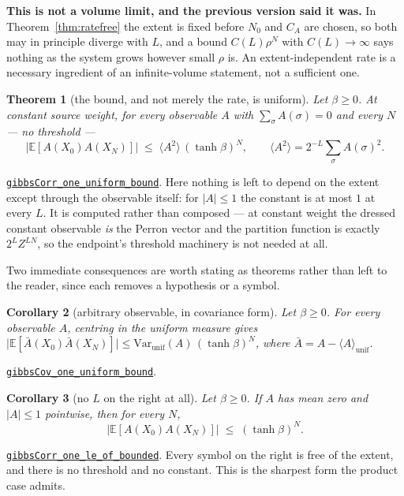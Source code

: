 \documentclass[11pt]{article}
\newtheorem{theorem}{Theorem}[section]
\newtheorem{corollary}[theorem]{Corollary}
\theoremstyle{definition}
\newcommand{\anchor}{247de2b31c8b2b6edb2cffe5fd6d96d6aa5c8a7a}
\newcommand{\osline}[3]{%
  \href{https://github.com/lluiseriksson/THE-ERIKSSON-PROGRAMME/blob/\anchor/YangMills/OS/#1.lean\#L#2}{\nolinkurl{#3}}}
\begin{document}
\textbf{This is not a volume limit, and the previous version said it was.}  In
Theorem~\ref{thm:ratefree} the extent is fixed before $N_0$ and $C_A$ are
chosen, so both may in principle diverge with $L$, and a bound $C(L)\rho^N$ with
$C(L)\to\infty$ says nothing as the system grows however small $\rho$ is.  An
extent-independent rate is a necessary ingredient of an infinite-volume
statement, not a sufficient one.

\begin{theorem}[the bound, and not merely the rate, is uniform]\label{thm:uniformbound}
Let $\beta\ge0$.  At constant source weight, for every observable $A$ with
$\sum_\sigma A(\sigma)=0$ and \emph{every} $N$ --- no threshold ---
\[
  \bigl|\mathbb{E}[A(X_0)A(X_N)]\bigr| \;\le\; \langle A^{2}\rangle \,(\tanh\beta)^{N},
  \qquad
  \langle A^{2}\rangle = 2^{-L}\!\sum_\sigma A(\sigma)^{2} .
\]
\end{theorem}

\osline{SpatialUniform}{644}{gibbsCorr\_one\_uniform\_bound}.
Here nothing is left to depend on the extent except through the observable
itself: for $|A|\le1$ the constant is at most $1$ at every $L$.  It is computed
rather than composed --- at constant weight the dressed constant observable
\emph{is} the Perron vector and the partition function is exactly
$2^{L}Z^{LN}$, so the endpoint's threshold machinery is not needed at all.

Two immediate consequences are worth stating as theorems rather than left to
the reader, since each removes a hypothesis or a symbol.

\begin{corollary}[arbitrary observable, in covariance form]\label{cor:cov}
Let $\beta\ge0$.  For \emph{every} observable $A$, centring in the uniform
measure gives
$\bigl|\mathbb{E}[\bar A(X_0)\bar A(X_N)]\bigr| \le
 \mathrm{Var}_{\mathrm{unif}}(A)\,(\tanh\beta)^{N}$, where
$\bar A = A - \langle A\rangle_{\mathrm{unif}}$.
\end{corollary}

\osline{SpatialUniform}{683}{gibbsCov\_one\_uniform\_bound}.

\begin{corollary}[no $L$ on the right at all]\label{cor:bounded}
Let $\beta\ge0$.  If $A$ has mean zero and $|A|\le1$ pointwise, then for every
$N$,
\[
  \bigl|\mathbb{E}[A(X_0)A(X_N)]\bigr| \;\le\; (\tanh\beta)^{N} .
\]
\end{corollary}

\osline{SpatialUniform}{699}{gibbsCorr\_one\_le\_of\_bounded}.
Every symbol on the right is free of the extent, and there is no threshold and
no constant.  This is the sharpest form the product case admits.
\end{document}

